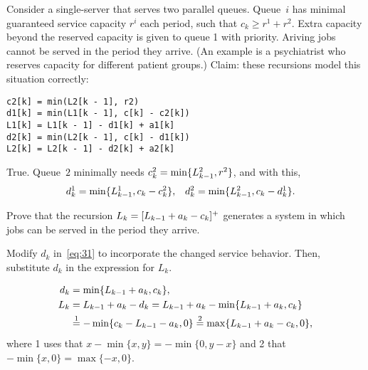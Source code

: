 \documentclass[stochastic-or.tex]{subfiles}
\begin{document}
\begin{truefalse}\label{ex:l-117}
Consider a single-server that serves two parallel queues.
Queue~$i$ has minimal guaranteed service capacity $r^i$ each period, such that $c_k \geq r^1 + r^2$.
Extra capacity beyond the reserved capacity is given to queue 1 with priority.
Ariving jobs cannot be served in the period they arrive.
(An example is a psychiatrist who reserves capacity for different patient groups.)
Claim: these recursions model this situation correctly:
\begin{verbatim}
c2[k] = min(L2[k - 1], r2)
d1[k] = min(L1[k - 1], c[k] - c2[k])
L1[k] = L1[k - 1] - d1[k] + a1[k]
d2[k] = min(L2[k - 1], c[k] - d1[k])
L2[k] = L2[k - 1] - d2[k] + a2[k]
\end{verbatim}

\begin{solution}
True.
Queue~$2$ minimally needs $c_{k}^2 = \min\{L_{k-1}^2, r^2\}$, and with this,
  \begin{align*}
 d_{k}^1 &= \min\{L_{k-1}^1, c_k-c_{k}^2\}, & d_{k}^2 &= \min\{L_{k-1}^2, c_k-d_{k}^1\}.
  \end{align*}
\end{solution}
\end{truefalse}




\begin{exercise}\label{ex:24}
Prove  that the recursion
$L_k = [L_{k-1}+a_k - c_k]^+$
generates a system in which jobs can be served in the period they arrive.
\begin{hint}
  Modify $d_k$ in~\cref{eq:31} to incorporate the changed service behavior.
  Then, substitute $d_k$ in the expression for $L_k$.
\end{hint}
\begin{solution}
 \begin{align*}
 d_k &= \min\{L_{k-1}+a_k, c_k\}, \\
L_k &= L_{k-1} + a_k - d_k  = L_{k-1} + a_k - \min\{L_{k-1}+a_k, c_k\} \\
&\stackrel1= -\min\{c_{k} - L_{k-1} - a_k, 0\} \stackrel2=  \max\{L_{k-1} + a_k - c_k, 0 \},
 \end{align*}
 where 1 uses that $x - \min\{x, y\} = -\min\{0, y-x\}$ and 2 that $-\min\{x, 0\} = \max\{-x, 0\}$.
\end{solution}
\end{exercise}





\end{document}
